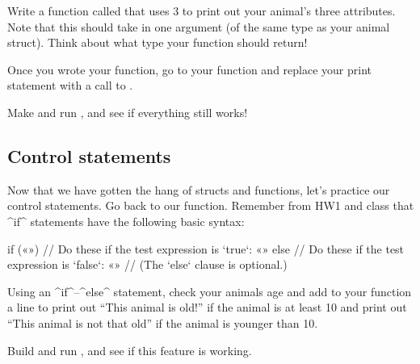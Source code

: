 \documentclass{tufte-handout}
\begin{document}
Write a function called  that uses
3 to print out your animal's three attributes.
Note that this should take in one argument (of the same type as your
animal struct). Think about what type your function should
return!

Once you wrote your function, go to your  function
and replace your print statement with a call to
.

Make and run , and see if everything still works!

\subsection{Control statements}

Now that we have gotten the hang of structs and functions, let's
practice our control statements.  Go back to our
 function.  Remember from HW1 and class that
^if^ statements have the following basic syntax:

\begin{Code}
    if («») {
        // Do these if the test expression is `true`:
        «»
    } else {
        // Do these if the test expression is `false`:
        «»
        // (The `else` clause is optional.)
    }
\end{Code}

Using an ^if^--^else^ statement, check your animals age and add to your
 function a line to print out ``This animal is
old!'' if the animal is at least 10 and print out ``This animal is not
that old'' if the animal is younger than 10.

Build and run , and see if this feature is working.
\end{document}
